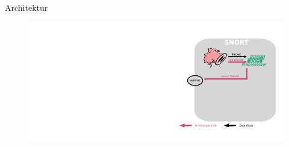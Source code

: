 \begin{frame}{Architektur}
    \begin{figure}
    	\centering
    	\includegraphics[width=\textwidth]{./images/4.pdf}
    \end{figure}
\end{frame}
